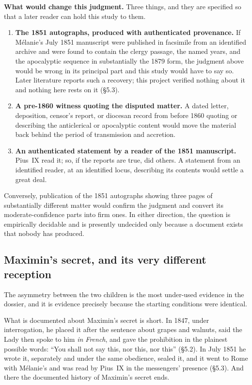 \textbf{What would change this judgment.} Three things, and they are
specified so that a later reader can hold this study to them.

\begin{enumerate}[leftmargin=1.4em,itemsep=0.15em,topsep=0.25em]
\item \textbf{The 1851 autographs, produced with authenticated
provenance.} If Mélanie's July 1851 manuscript were published in
facsimile from an identified archive and were found to contain the
clergy passage, the named years, and the apocalyptic sequence in
substantially the 1879 form, the judgment above would be wrong in
its principal part and this study would have to say so. Later
literature reports such a recovery; this project verified nothing
about it and nothing here rests on it (\S5.3).
\item \textbf{A pre-1860 witness quoting the disputed matter.} A
dated letter, deposition, censor's report, or diocesan record from
before 1860 quoting or describing the anticlerical or apocalyptic
content would move the material back behind the period of
transmission and accretion.
\item \textbf{An authenticated statement by a reader of the 1851
manuscript.} Pius~IX read it; so, if the reports are true, did
others. A statement from an identified reader, at an identified
locus, describing its contents would settle a great deal.
\end{enumerate}

Conversely, publication of the 1851 autographs showing three pages
of substantially different matter would confirm the judgment and
convert its moderate-confidence parts into firm ones. In either
direction, the question is empirically decidable and is presently
undecided only because a document exists that nobody has produced.

\subsection{Maximin's secret, and its very different reception}

The asymmetry between the two children is the most under-used
evidence in the dossier, and it is evidence precisely because the
starting conditions were identical.

What is documented about Maximin's secret is short. In 1847, under
interrogation, he placed it after the sentence about grapes and
walnuts, said the Lady then spoke to him \emph{in French}, and gave
the prohibition in the plainest possible words: ``You shall not say
this, nor this, nor this'' (\S5.2). In July 1851 he wrote it,
separately and under the same obedience, sealed it, and it went to
Rome with Mélanie's and was read by Pius~IX in the messengers'
presence (\S5.3). And there the documented history of Maximin's
secret ends.

